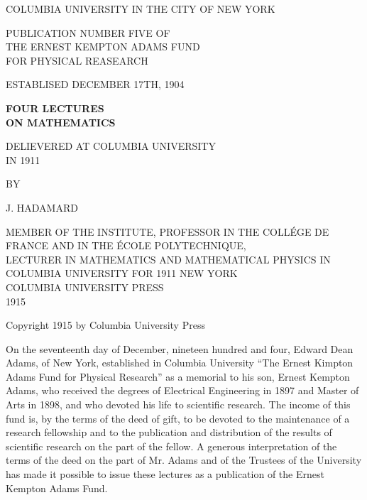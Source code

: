 \documentclass[12pt,oneside]{book}
\begin{document}
\begin{titlepage}
    \centering
    {\large COLUMBIA UNIVERSITY IN THE CITY OF NEW YORK \par}
    {\normalsize PUBLICATION NUMBER FIVE OF\\THE ERNEST KEMPTON ADAMS FUND\\FOR PHYSICAL REASEARCH\par}
    {\normalsize ESTABLISED DECEMBER 17TH, 1904 \par}
    \vspace*{-\baselineskip}
    \noindent\makebox[\linewidth]{\rule{14cm}{0.4pt}}
    {\Huge \textbf{FOUR LECTURES\\ON MATHEMATICS} \par}
    \vspace{1cm}
    {\large DELIEVERED AT COLUMBIA UNIVERSITY\\IN 1911 \par}
    \vspace{2cm}
    {\normalsize BY \par}
    \vspace*{-\baselineskip}
    {\large J. HADAMARD \par}
    \vspace{0.5cm}
    {\tiny MEMBER OF THE INSTITUTE, PROFESSOR IN THE COLL\'EGE DE FRANCE AND IN THE \'ECOLE POLYTECHNIQUE,\\
    LECTURER IN MATHEMATICS AND MATHEMATICAL PHYSICS IN COLUMBIA UNIVERSITY FOR 1911}
    \vfill
    {\large NEW YORK\\COLUMBIA UNIVERSITY PRESS\\1915}
\end{titlepage}

\begin{center}
    Copyright 1915 by Columbia University Press 
\end{center}

\pagebreak

On the seventeenth day of December, nineteen hundred and four, Edward Dean Adams, of New York, established
in Columbia University ``The Ernest Kimpton Adams Fund for Physical Research'' as a memorial to his son, 
Ernest Kempton Adams, who received the degrees of Electrical Engineering in 1897 and Master of Arts in 1898,
and who devoted his life to scientific research. The income of this fund is, by the terms of the deed of gift, 
to be devoted to the maintenance of a research fellowship and to the publication and distribution of the 
results of scientific research on the part of the fellow. A generous interpretation of the terms of the deed
on the part of Mr. Adams and of the Trustees of the University has made it possible to issue these lectures as
a publication of the Ernest Kempton Adams Fund. \par 
\noindent\makebox{\rule{16.5cm}{1pt}}
\end{document}
